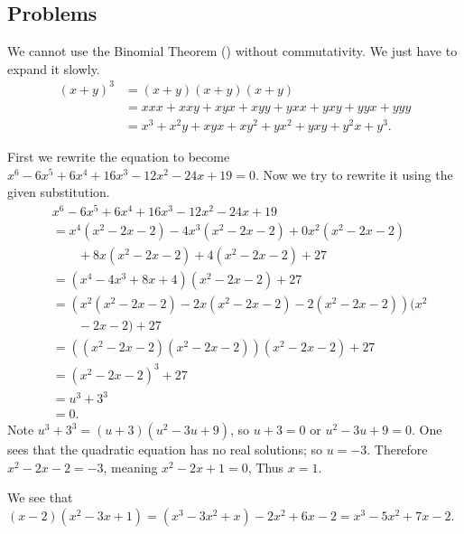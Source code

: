 \subsection*{Problems}
\begin{questions}
    \item We cannot use the Binomial Theorem () without commutativity. We just have to expand it slowly.
    \begin{align*}
        (x+y)^3 &= (x+y)(x+y)(x+y)\\
        &= xxx + xxy + xyx + xyy + yxx + yxy + yyx + yyy\\
        &= x^3 + x^2y + xyx + xy^2 + yx^2 + yxy + y^2x + y^3.
    \end{align*}

    \item First we rewrite the equation to become $x^6 - 6x^5 + 6x^4 + 16x^3 - 12x^2 - 24x + 19 = 0$. Now we try to rewrite it using the given substitution.
    \begin{align*}
        &x^6 - 6x^5 + 6x^4 + 16x^3 - 12x^2 - 24x + 19\\
        &=x^4(x^2-2x-2) - 4x^3(x^2-2x-2) + 0x^2(x^2-2x-2)\\
        &\quad\quad+ 8x(x^2-2x-2) + 4(x^2-2x-2) + 27\\
        &= (x^4-4x^3+8x+4)(x^2-2x-2) + 27\\
        &= \left(x^2(x^2-2x-2) - 2x(x^2-2x-2) - 2(x^2-2x-2)\right)(x^2\\
        &\quad\quad- 2x-2) + 27\\
        &= ((x^2-2x-2)(x^2-2x-2))(x^2-2x-2)+27\\
        &= (x^2-2x-2)^3 + 27\\
        &= u^3 + 3^3\\
        &= 0.
    \end{align*}
    Note $u^3 + 3^3 = (u+3)(u^2 - 3u + 9)$, so $u+3 = 0$ or $u^2 - 3u + 9 = 0$. One sees that the quadratic equation has no real solutions; so $u = -3$. Therefore $x^2 - 2x - 2 = -3$, meaning $x^2-2x+1 = 0$, Thus $x = 1$.

    \item \begin{partquestions}{\roman*}
        \item We see that $(x-2)(x^2-3x+1) = (x^3 - 3x^2 + x) - 2x^2 + 6x - 2 = x^3 - 5x^2 + 7x - 2$.


\end{partquestions}
\end{questions}
